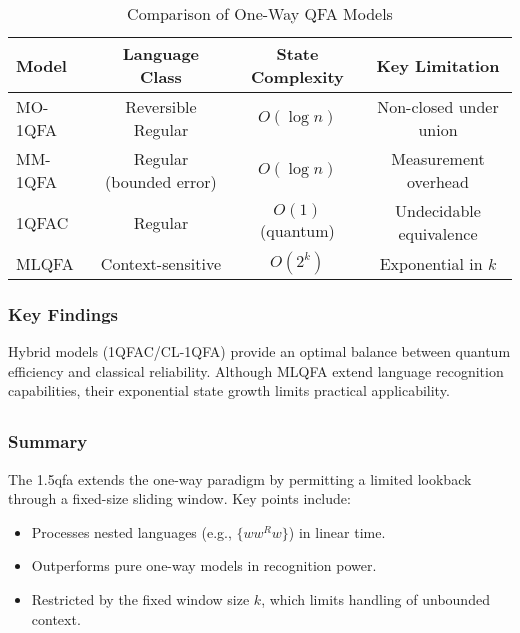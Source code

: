 \begin{table}[ht]
\centering
\label{tab:one_way}
\begin{tabular}{|l|c|c|c|}
\hline
\textbf{Model} & \textbf{Language Class} & \textbf{State Complexity} & \textbf{Key Limitation} \\ \hline
MO-1QFA   & Reversible Regular & $O(\log n)$ & Non-closed under union \\ \hline
MM-1QFA   & Regular (bounded error) & $O(\log n)$ & Measurement overhead \\ \hline
1QFAC     & Regular & $O(1)$ (quantum) & Undecidable equivalence \\ \hline
MLQFA     & Context-sensitive & $O(2^k)$ & Exponential in $k$ \\ \hline
\end{tabular}
\caption{Comparison of One-Way QFA Models}
\end{table}

\subsubsection{Key Findings}
Hybrid models (1QFAC/CL-1QFA) provide an optimal balance between quantum efficiency and classical reliability. Although MLQFA extend language recognition capabilities, their exponential state growth limits practical applicability.

\subsection*{}

\subsubsection{Summary}
The \gls{1.5qfa} extends the one-way paradigm by permitting a limited lookback through a fixed-size sliding window. Key points include:
\begin{itemize}
    \item Processes nested languages (e.g., $\{ww^Rw\}$) in linear time.
    \item Outperforms pure one-way models in recognition power.
    \item Restricted by the fixed window size $k$, which limits handling of unbounded context.
\end{itemize}

